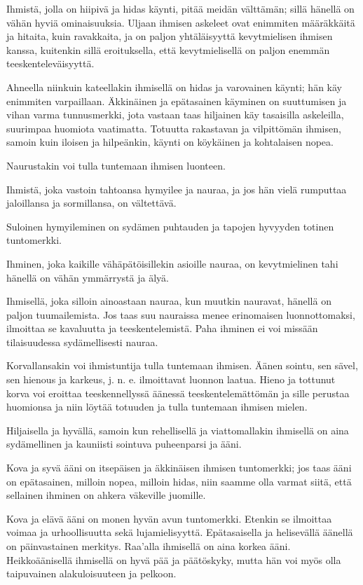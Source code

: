 \documentclass[11pt, twoside, finnish, a5paper]{book}
\begin{document}
Ihmistä, jolla on hiipivä ja hidas käynti, pitää meidän
välttämän; sillä hänellä on vähän hyviä ominaisuuksia.
Uljaan ihmisen askeleet ovat enimmiten määräkkäitä ja hitaita,
kuin ravakkaita, ja on paljon yhtäläisyyttä kevytmielisen
ihmisen kanssa, kuitenkin sillä eroituksella, että
kevytmielisellä on paljon enemmän teeskenteleväisyyttä.

Ahneella niinkuin kateellakin ihmisellä on hidas ja
varovainen käynti; hän käy enimmiten varpaillaan. 
Äkkinäinen ja epätasainen käyminen on suuttumisen ja vihan
varma tunnusmerkki, jota vastaan taas hiljainen käy tasaisilla
askeleilla, suurimpaa huomiota vaatimatta. Totuutta
rakastavan ja vilpittömän ihmisen, samoin kuin iloisen ja
hilpeänkin, käynti on köykäinen ja kohtalaisen nopea.

Naurustakin voi tulla tuntemaan ihmisen luonteen.

Ihmistä, joka vastoin tahtoansa hymyilee ja nauraa,
ja jos hän vielä rumputtaa jaloillansa ja sormillansa, on
vältettävä.
 
Suloinen hymyileminen on sydämen puhtauden ja
tapojen hyvyyden totinen tuntomerkki.

Ihminen, joka kaikille vähäpätöisillekin asioille nauraa,
on kevytmielinen tahi hänellä on vähän ymmärrystä ja älyä.

Ihmisellä, joka silloin ainoastaan nauraa, kun muutkin
nauravat, hänellä on paljon tuumailemista. Jos taas suu
nauraissa menee erinomaisen luonnottomaksi, ilmoittaa
se kavaluutta ja teeskentelemistä. Paha ihminen
ei voi missään tilaisuudessa sydämellisesti nauraa.

Korvallansakin voi ihmistuntija tulla tuntemaan ihmisen.
Äänen sointu, sen sävel, sen hienous ja karkeus,
j. n. e. ilmoittavat luonnon laatua. Hieno ja tottunut
korva voi eroittaa teeskennellyssä äänessä teeskentelemättömän
ja sille perustaa huomionsa ja niin löytää
totuuden ja tulla tuntemaan ihmisen mielen.

Hiljaisella ja hyvällä, samoin kun rehellisellä ja
viattomallakin ihmisellä on aina sydämellinen ja kauniisti
sointuva puheenparsi ja ääni.

Kova ja syvä ääni on itsepäisen ja äkkinäisen ihmisen
tuntomerkki; jos taas ääni on epätasainen, milloin nopea,
milloin hidas, niin saamme olla varmat siitä, että
sellainen ihminen on ahkera väkeville juomille.

Kova ja elävä ääni on monen hyvän avun tuntomerkki.
Etenkin se ilmoittaa voimaa ja urhoollisuutta sekä lujamielisyyttä.
Epätasaisella ja helisevällä äänellä on päinvastainen merkitys.
Raa'alla ihmisellä on aina korkea ääni. Heikkoäänisellä ihmisellä
on hyvä pää ja päätöskyky, mutta hän voi myös olla taipuvainen
alakuloisuuteen ja pelkoon.
\end{document}
